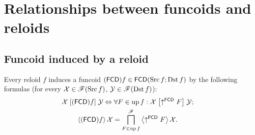 
\chapter{Relationships between funcoids and reloids}


\section{Funcoid induced by a reloid}

Every reloid $f$ induces a funcoid
$(\mathsf{FCD}) f\in\mathsf{FCD}(\operatorname{Src} f;\operatorname{Dst} f)$ by the following formulas
(for every $\mathcal{X}\in\mathscr{F}(\operatorname{Src} f)$, $\mathcal{Y}\in\mathscr{F}(\operatorname{Dst} f)$):
\begin{gather*}
\mathcal{X}\mathrel{\left[(\mathsf{FCD}) f\right]}\mathcal{Y}\Leftrightarrow\forall F\in\operatorname{up} f:\mathcal{X}\mathrel{\left[\uparrow^{\mathsf{FCD}}F\right]}\mathcal{Y};\\
\left\langle (\mathsf{FCD}) f\right\rangle\mathcal{X}=\bigsqcap_{F\in\operatorname{up} f}^{\mathscr{F}}\left\langle \uparrow^{\mathsf{FCD}}F\right\rangle\mathcal{X}.
\end{gather*}


